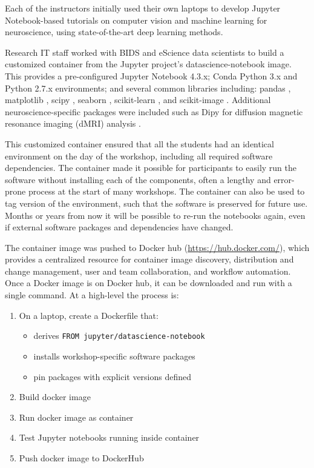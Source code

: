 Each of the instructors initially used their own laptops to develop Jupyter
Notebook-based tutorials on computer vision and machine learning for
neuroscience, using state-of-the-art deep learning methods.

Research IT staff worked with BIDS and eScience data scientists to build a
customized container from the Jupyter project's datascience-notebook image. This
provides a pre-configured Jupyter Notebook 4.3.x; Conda Python 3.x and Python
2.7.x environments; and several common libraries including: pandas
\cite{mckinney-proc-scipy-2010}, matplotlib \cite{hunter2007matplotlib}, scipy
\cite{scipy}, seaborn \cite{michael_waskom_2014_12710}, scikit-learn
\cite{Pedregosa2012-dm}, and scikit-image \cite{van2014scikit}. Additional
neuroscience-specific packages were included such as Dipy for diffusion magnetic
resonance imaging (dMRI) analysis \cite{Garyfallidis2014FrontNeuroinf}.

This customized container ensured that all the students had an identical
environment on the day of the workshop, including all required software
dependencies. The container made it possible for participants to easily run the
software without installing each of the components, often a lengthy and
error-prone process at the start of many workshops. The container can also be
used to tag version of the environment, such that the software is preserved
for future use. Months or years from now it will be possible to re-run the
notebooks again, even if external software packages and dependencies have
changed.

The container image was pushed to Docker hub (\url{https://hub.docker.com/}),
which provides a centralized resource for container image discovery,
distribution and change management, user and team collaboration, and workflow
automation. Once a Docker image is on Docker hub, it can be downloaded and run
with a single command. At a high-level the process is:

\begin{enumerate}
  \item On a laptop, create a Dockerfile that:
  \begin{itemize}
    \item derives \texttt{FROM jupyter/datascience-notebook}
    \item installs workshop-specific software packages
    \item pin packages with explicit versions defined
  \end{itemize}
  \item Build docker image
  \item Run docker image as container
  \item Test Jupyter notebooks running inside container
  \item Push docker image to DockerHub
\end{enumerate}


